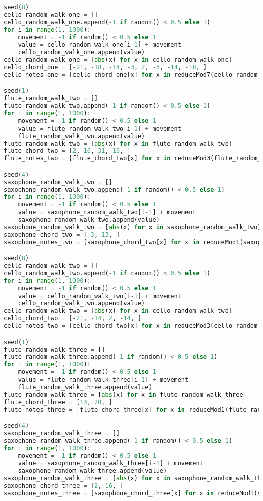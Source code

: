 \begin{lstlisting}[language=Python, caption=Four Ages of Sand Segment\_IV]
seed(8)
cello_random_walk_one = []
cello_random_walk_one.append(-1 if random() < 0.5 else 1)
for i in range(1, 1000):
    movement = -1 if random() < 0.5 else 1
    value = cello_random_walk_one[i-1] + movement
    cello_random_walk_one.append(value)
cello_random_walk_one = [abs(x) for x in cello_random_walk_one]
cello_chord_one = [-21, -18, -14, -3, 2, -3, -14, -18, ]
cello_notes_one = [cello_chord_one[x] for x in reduceMod7(cello_random_walk_one)]

seed(1)
flute_random_walk_two = []
flute_random_walk_two.append(-1 if random() < 0.5 else 1)
for i in range(1, 1000):
    movement = -1 if random() < 0.5 else 1
    value = flute_random_walk_two[i-1] + movement
    flute_random_walk_two.append(value)
flute_random_walk_two = [abs(x) for x in flute_random_walk_two]
flute_chord_two = [2, 16, 31, 16, ]
flute_notes_two = [flute_chord_two[x] for x in reduceMod3(flute_random_walk_two)]

seed(4)
saxophone_random_walk_two = []
saxophone_random_walk_two.append(-1 if random() < 0.5 else 1)
for i in range(1, 1000):
    movement = -1 if random() < 0.5 else 1
    value = saxophone_random_walk_two[i-1] + movement
    saxophone_random_walk_two.append(value)
saxophone_random_walk_two = [abs(x) for x in saxophone_random_walk_two]
saxophone_chord_two = [-3, 13, ]
saxophone_notes_two = [saxophone_chord_two[x] for x in reduceMod1(saxophone_random_walk_two)]

seed(8)
cello_random_walk_two = []
cello_random_walk_two.append(-1 if random() < 0.5 else 1)
for i in range(1, 1000):
    movement = -1 if random() < 0.5 else 1
    value = cello_random_walk_two[i-1] + movement
    cello_random_walk_two.append(value)
cello_random_walk_two = [abs(x) for x in cello_random_walk_two]
cello_chord_two = [-21, -14, 2, -14, ]
cello_notes_two = [cello_chord_two[x] for x in reduceMod3(cello_random_walk_two)]

seed(1)
flute_random_walk_three = []
flute_random_walk_three.append(-1 if random() < 0.5 else 1)
for i in range(1, 1000):
    movement = -1 if random() < 0.5 else 1
    value = flute_random_walk_three[i-1] + movement
    flute_random_walk_three.append(value)
flute_random_walk_three = [abs(x) for x in flute_random_walk_three]
flute_chord_three = [13, 20, ]
flute_notes_three = [flute_chord_three[x] for x in reduceMod1(flute_random_walk_three)]

seed(4)
saxophone_random_walk_three = []
saxophone_random_walk_three.append(-1 if random() < 0.5 else 1)
for i in range(1, 1000):
    movement = -1 if random() < 0.5 else 1
    value = saxophone_random_walk_three[i-1] + movement
    saxophone_random_walk_three.append(value)
saxophone_random_walk_three = [abs(x) for x in saxophone_random_walk_three]
saxophone_chord_three = [2, 16, ]
saxophone_notes_three = [saxophone_chord_three[x] for x in reduceMod1(saxophone_random_walk_three)]


\end{lstlisting}
